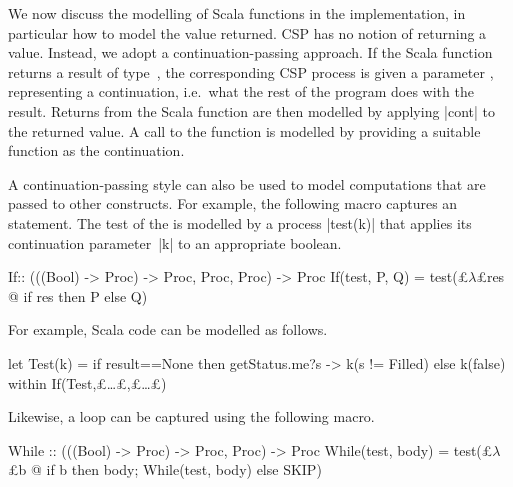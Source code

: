 We now discuss the modelling of Scala functions in the implementation, in
particular how to model the value returned.  CSP has no notion of returning a
value.  Instead, we adopt a continuation-passing approach.  If the Scala
function returns a result of type~, the corresponding CSP process is
given a parameter ,  representing a continuation,
i.e.~what the rest of the program does with the result.  Returns from the
Scala function are then modelled by applying |cont| to the returned value.  A
call to the function is modelled by providing a suitable function as the
continuation.

A continuation-passing style can also be used to model computations that are
passed to other constructs.  For example, the following macro captures an
 statement.  The test of the  is modelled by a process
|test(k)| that applies its continuation parameter~|k| to an appropriate
boolean. 
%
\begin{cspm}
If:: (((Bool) -> Proc) -> Proc, Proc, Proc) -> Proc
If(test, P, Q) = test(£$\lambda$£res @ if res then P else Q)
\end{cspm}
%
For example, Scala code  can be modelled as follows. 
%
\begin{cspm}
let Test(k) = if result==None then getStatus.me?s -> k(s != Filled) else k(false)
within If(Test,£\ldots£,£\ldots£)
\end{cspm}
%
Likewise, a  loop can be captured using the following macro.
%
\begin{cspm}
While :: (((Bool) -> Proc) -> Proc, Proc) -> Proc
While(test, body) = test(£$\lambda$£b @ if b then body; While(test, body) else SKIP)
\end{cspm}
